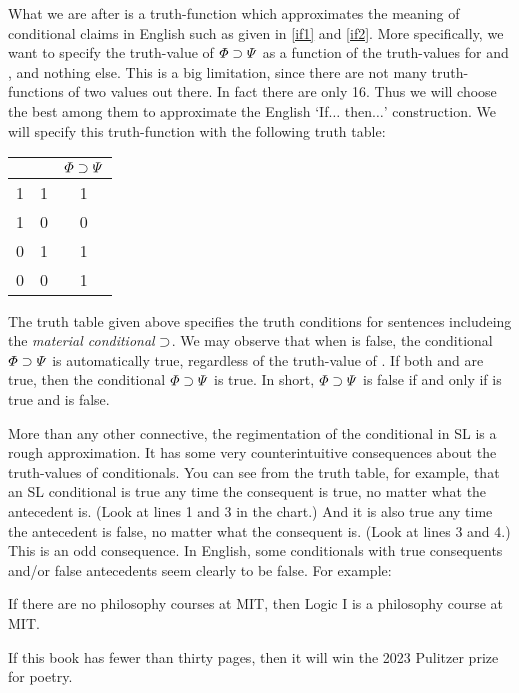 What we are after is a truth-function which approximates the meaning of conditional claims in English such as given in \ref{if1} and \ref{if2}.
More specifically, we want to specify the truth-value of $\varPhi{}\supset\varPsi{}$ as a function of the truth-values for \metaA{} and \metaB{}, and nothing else.
This is a big limitation, since there are not many truth-functions of two values out there.
In fact there are only 16.
Thus we will choose the best among them to approximate the English `If$\ldots$ then$\ldots$' construction.
We will specify this truth-function with the following truth table:

\begin{center}
\begin{tabular}{c|c|c}
\metaA{} & \metaB{} & $\varPhi{}\supset\varPsi{}$\\
\hline
1 & 1 & 1\\
1 & 0 & 0\\
0 & 1 & 1\\
0 & 0 & 1
\end{tabular}
\end{center}
 
The truth table given above specifies the truth conditions for sentences includeing the \textit{material conditional} $\supset$.
We may observe that when \metaA{} is false, the conditional $\varPhi{}\supset\varPsi{}$ is automatically true, regardless of the truth-value of \metaB{}.
If both \metaA{} and \metaB{} are true, then the conditional $\varPhi{}\supset\varPsi{}$ is true.
In short, $\varPhi{}\supset\varPsi{}$ is false if and only if \metaA{} is true and \metaB{} is false.

More than any other connective, the regimentation of the conditional in SL is a rough approximation.
It has some very counterintuitive consequences about the truth-values of conditionals.
You can see from the truth table, for example, that an SL conditional is true any time the consequent is true, no matter what the antecedent is.
(Look at lines 1 and 3 in the chart.) 
And it is also true any time the antecedent is false, no matter what the consequent is.
(Look at lines 3 and 4.) 
This is an odd consequence.
In English, some conditionals with true consequents and/or false antecedents seem clearly to be false.
For example:

\begin{earg}
\item[\ex{pmc1}] If there are no philosophy courses at MIT, then Logic I is a philosophy course at MIT.
\item[\ex{pmc2}] If this book has fewer than thirty pages, then it will win the 2023 Pulitzer prize for poetry.
\end{earg}

